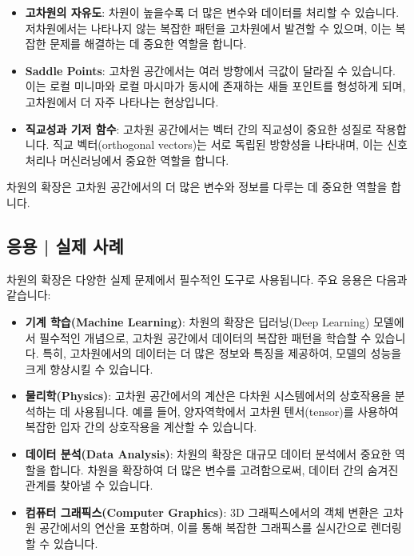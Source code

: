 \begin{itemize}
  \item \textbf{고차원의 자유도}: 차원이 높을수록 더 많은 변수와 데이터를 처리할 수 있습니다. 저차원에서는 나타나지 않는 복잡한 패턴을 고차원에서 발견할 수 있으며, 이는 복잡한 문제를 해결하는 데 중요한 역할을 합니다.

  \item \textbf{Saddle Points}: 고차원 공간에서는 여러 방향에서 극값이 달라질 수 있습니다. 이는 로컬 미니마와 로컬 마시마가 동시에 존재하는 새들 포인트를 형성하게 되며, 고차원에서 더 자주 나타나는 현상입니다.

  \item \textbf{직교성과 기저 함수}: 고차원 공간에서는 벡터 간의 직교성이 중요한 성질로 작용합니다. 직교 벡터(orthogonal vectors)는 서로 독립된 방향성을 나타내며, 이는 신호 처리나 머신러닝에서 중요한 역할을 합니다.
\end{itemize}

\vspace{1\baselineskip}
\noindent 차원의 확장은 고차원 공간에서의 더 많은 변수와 정보를 다루는 데 중요한 역할을 합니다.

\subsection{응용 | 실제 사례}
차원의 확장은 다양한 실제 문제에서 필수적인 도구로 사용됩니다. 주요 응용은 다음과 같습니다:

\begin{itemize}
  \item \textbf{기계 학습(Machine Learning)}: 차원의 확장은 딥러닝(Deep Learning) 모델에서 필수적인 개념으로, 고차원 공간에서 데이터의 복잡한 패턴을 학습할 수 있습니다. 특히, 고차원에서의 데이터는 더 많은 정보와 특징을 제공하여, 모델의 성능을 크게 향상시킬 수 있습니다.

  \item \textbf{물리학(Physics)}: 고차원 공간에서의 계산은 다차원 시스템에서의 상호작용을 분석하는 데 사용됩니다. 예를 들어, 양자역학에서 고차원 텐서(tensor)를 사용하여 복잡한 입자 간의 상호작용을 계산할 수 있습니다.

  \item \textbf{데이터 분석(Data Analysis)}: 차원의 확장은 대규모 데이터 분석에서 중요한 역할을 합니다. 차원을 확장하여 더 많은 변수를 고려함으로써, 데이터 간의 숨겨진 관계를 찾아낼 수 있습니다.

  \item \textbf{컴퓨터 그래픽스(Computer Graphics)}: 3D 그래픽스에서의 객체 변환은 고차원 공간에서의 연산을 포함하며, 이를 통해 복잡한 그래픽스를 실시간으로 렌더링할 수 있습니다.
\end{itemize}

